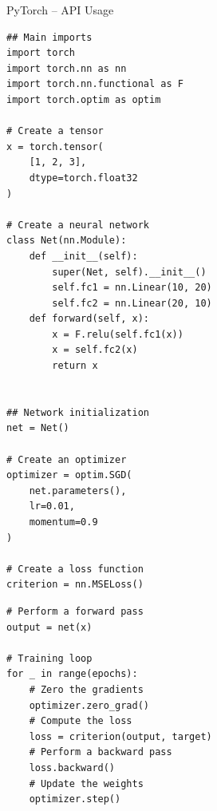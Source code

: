 \documentclass[presentation, 9pt]{beamer}\mode<presentation>{\usetheme{AMSBolognaFC}}
\begin{document}
\begin{frame}[fragile]{PyTorch -- API Usage}
\begin{multicols}{2}
\begin{verbatim}
## Main imports
import torch
import torch.nn as nn
import torch.nn.functional as F
import torch.optim as optim

# Create a tensor
x = torch.tensor(
	[1, 2, 3], 
	dtype=torch.float32
)

# Create a neural network
class Net(nn.Module):
	def __init__(self):
		super(Net, self).__init__()
		self.fc1 = nn.Linear(10, 20)
		self.fc2 = nn.Linear(20, 10)
	def forward(self, x):
		x = F.relu(self.fc1(x))
		x = self.fc2(x)
		return x


## Network initialization
net = Net()

# Create an optimizer
optimizer = optim.SGD(
	net.parameters(), 
	lr=0.01, 
	momentum=0.9
)

# Create a loss function
criterion = nn.MSELoss()
\end{verbatim}

\begin{verbatim}
# Perform a forward pass
output = net(x)

# Training loop
for _ in range(epochs):
	# Zero the gradients
	optimizer.zero_grad()
	# Compute the loss
	loss = criterion(output, target)
	# Perform a backward pass
	loss.backward()
	# Update the weights
	optimizer.step()

\end{verbatim}
\end{multicols}
\end{frame}
\end{document}
